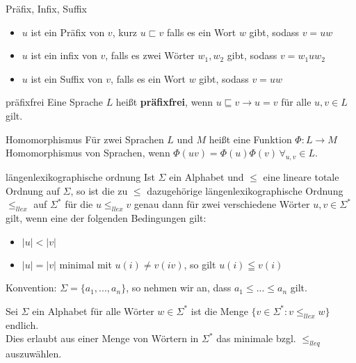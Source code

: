 
\begin{defn}{Präfix, Infix, Suffix}
    \begin{itemize}
        \item $u$ ist ein Präfix von $v$, kurz $u \sqsubset v$ falls es ein Wort $w$ gibt, sodass $v=uw$
        \item $u$ ist ein infix von $v$,  falls es zwei Wörter $w_1,w_2$ gibt, sodass $v=w_1uw_2$
        \item $u$ ist ein Suffix von $v$, falls es ein Wort $w$ gibt, sodass $v=uw$
    \end{itemize}
\end{defn}

\begin{defn}{präfixfrei}
    Eine Sprache $L$ heißt \textbf{präfixfrei}, wenn $u \sqsubseteq v \rightarrow u = v$ für alle $u,v \in L$ gilt.
\end{defn}

\begin{defn}{Homomorphismus}
    Für zwei Sprachen $L$ und $M$ heißt eine Funktion $\Phi :L\rightarrow M$ Homomorphismus von Sprachen, wenn $\Phi(uv) = \Phi(u)\Phi(v) \, \forall_{u,v} \in L$.
\end{defn}

\begin{defn}{längenlexikographische ordnung}
    Ist $\Sigma$ ein Alphabet und $\leq$ eine lineare totale Ordnung auf $\Sigma$, so ist die zu $\leq$ dazugehörige längenlexikographische Ordnung $\leq_{llex}$ auf $\Sigma^*$ für die $u \leq_{llex} v$ genau dann für zwei verschiedene Wörter $u,v \in \Sigma^*$ gilt, wenn eine der folgenden Bedingungen gilt:
    \begin{itemize}
        \item $|u| < |v|$ 
        \item $|u| = |v|$ minimal mit $u(i) \neq v(iv)$, so gilt $u(i) \leqq v(i)$
    \end{itemize}
    Konvention: $\Sigma = \{a_1,...,a_n\}$, so nehmen wir an, dass $a_1\leq...\leq a_n$ gilt.
\end{defn}

\begin{bem}
    Sei $\Sigma$ ein Alphabet für alle Wörter $w \in \Sigma^*$ ist die Menge $\{v \in \Sigma^*:v\leq_{llex}w\}$ endlich. \\
    Dies erlaubt aus einer Menge von Wörtern in $\Sigma^*$ das minimale bzgl. $\leq_{lleq}$ auszuwählen.
\end{bem}

